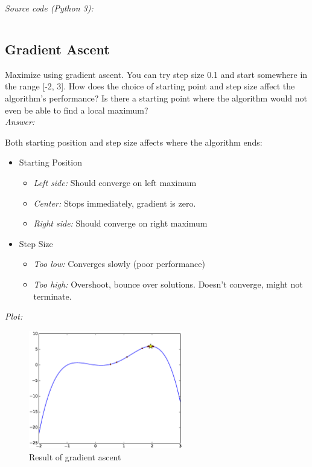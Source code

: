 \textit{Source code (Python 3):}
\inputminted{Python}{py/w1e1b.py}

\subsection{Gradient Ascent \marginsymbol}
\label{subsec:grada}
Maximize using gradient ascent.
You can try step size 0.1 and start somewhere in the range [-2, 3].
How does the choice of starting point and step size affect the algorithm's performance?
Is there a starting point where the algorithm would not even be able to find a local maximum?\\

\textit{Answer:}

Both starting position and step size affects where the algorithm ends:
\begin{itemize}
    \item Starting Position
    \begin{itemize}
        \item \textit{Left side:} Should converge on left maximum
        \item \textit{Center:} Stops immediately, gradient is zero.
        \item \textit{Right side:} Should converge on right maximum
    \end{itemize}
    \item Step Size
    \begin{itemize}
        \item \textit{Too low:} Converges slowly (poor performance)
        \item \textit{Too high:} Overshoot, bounce over solutions. Doesn't converge, might not terminate.
    \end{itemize}
\end{itemize}

\textit{Plot:}
\begin{figure}[H]
\begin{center}
\includegraphics[width=0.6\textwidth]{eps/w1e1c.eps}
\caption{Result of gradient ascent}
\label{fig:w1e1c}
\end{center}
\end{figure}

